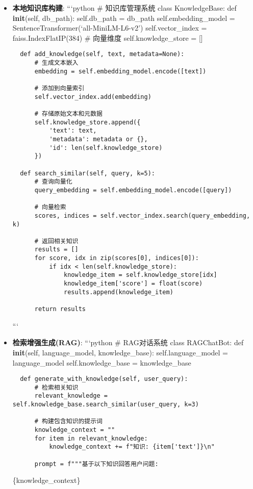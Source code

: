 \begin{itemize}
\item
  \textbf{本地知识库构建}: ```python \# 知识库管理系统 class
  KnowledgeBase: def \textbf{init}(self, db\_path): self.db\_path =
  db\_path self.embedding\_model =
  SentenceTransformer(`all-MiniLM-L6-v2') self.vector\_index =
  faiss.IndexFlatIP(384) \# 向量维度 self.knowledge\_store = {[}{]}

\begin{lstlisting}
  def add_knowledge(self, text, metadata=None):
      # 生成文本嵌入
      embedding = self.embedding_model.encode([text])

      # 添加到向量索引
      self.vector_index.add(embedding)

      # 存储原始文本和元数据
      self.knowledge_store.append({
          'text': text,
          'metadata': metadata or {},
          'id': len(self.knowledge_store)
      })

  def search_similar(self, query, k=5):
      # 查询向量化
      query_embedding = self.embedding_model.encode([query])

      # 向量检索
      scores, indices = self.vector_index.search(query_embedding, k)

      # 返回相关知识
      results = []
      for score, idx in zip(scores[0], indices[0]):
          if idx < len(self.knowledge_store):
              knowledge_item = self.knowledge_store[idx]
              knowledge_item['score'] = float(score)
              results.append(knowledge_item)

      return results
\end{lstlisting}

  ```
\item
  \textbf{检索增强生成(RAG)}: ```python \# RAG对话系统 class RAGChatBot:
  def \textbf{init}(self, language\_model, knowledge\_base):
  self.language\_model = language\_model self.knowledge\_base =
  knowledge\_base

\begin{lstlisting}
  def generate_with_knowledge(self, user_query):
      # 检索相关知识
      relevant_knowledge = self.knowledge_base.search_similar(user_query, k=3)

      # 构建包含知识的提示词
      knowledge_context = ""
      for item in relevant_knowledge:
          knowledge_context += f"知识: {item['text']}\n"

      prompt = f"""基于以下知识回答用户问题:
\end{lstlisting}

  \{knowledge\_context\}
\end{itemize}

